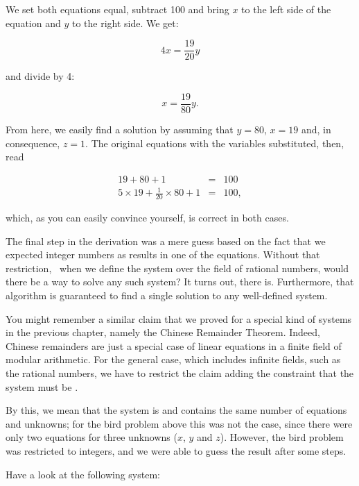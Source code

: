 \documentclass[tikz]{scrreprt}
\begin{document}
We set both equations equal, subtract 100
and bring $x$ to the left side of the equation
and $y$ to the right side. We get:

\begin{equation}
4x = \frac{19}{20}y
\end{equation}

and divide by 4:

\begin{equation}
x = \frac{19}{80}y.
\end{equation}

From here, we easily find a solution
by assuming that $y=80$, $x=19$ and, in consequence,
$z=1$. The original equations with the variables 
substituted, then, read 

\begin{equation}
\begin{array}{lcl}
19 + 80 + 1 & = & 100\\
5\times 19 + \frac{1}{20}\times 80 + 1 & = & 100,
\end{array}
\end{equation}

which, as you can easily convince yourself, is correct
in both cases.

The final step in the derivation was a mere guess
based on the fact that we expected integer numbers
as results in one of the equations. 
Without that restriction, \ie\ when
we define the system over the field of rational
numbers, would there be a way to solve any such
system? It turns out, there is. Furthermore,
that algorithm is guaranteed to find a single solution to
any well-defined system.

You might remember a similar claim that we proved
for a special kind of systems in the previous chapter,
namely the Chinese Remainder Theorem. Indeed,
Chinese remainders are just a special case of
linear equations in a finite field of modular arithmetic.
For the general case, which includes infinite fields,
such as the rational numbers, we have to restrict
the claim adding the constraint that the system
must be .

By this, we mean that the system
is  and contains the same number of 
 equations
and unknowns; for the bird problem above this was
not the case, since there were only two equations
for three unknowns ($x$, $y$ and $z$). 
However, the bird problem was restricted to integers,
and we were able to guess the result after some steps. 

Have a look at the following system: 
\end{document}
